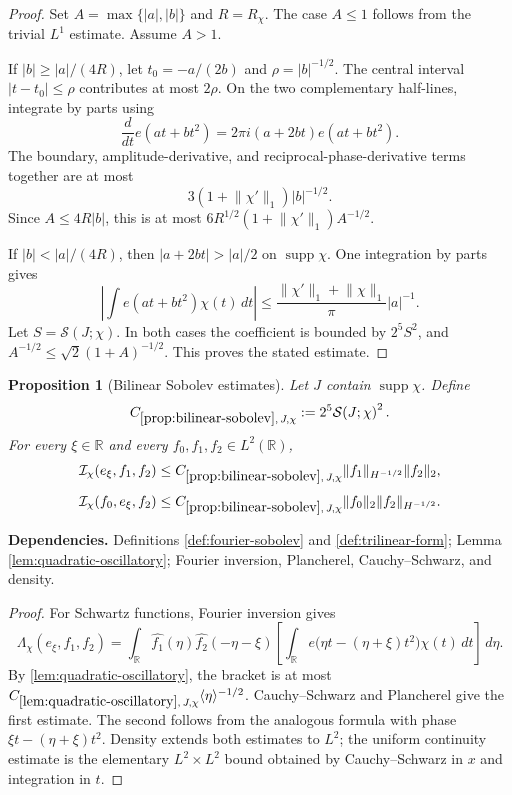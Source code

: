 \documentclass[11pt]{article}
\newtheorem{proposition}[proposition]{Proposition}
\theoremstyle{definition}
\theoremstyle{remark}
\newcommand{\R}{\mathbb R}
\newcommand{\supp}{\operatorname{supp}}
\newcommand{\1}{\mathbf 1}
\newcommand{\FT}[1]{\widehat{#1}}
\newcommand{\br}[1]{\langle #1\rangle}
\newcommand{\dd}{\,d}
\newcommand{\Ichi}{\mathcal I_{\chi}}
\newcommand{\Lamchi}{\Lambda_{\chi}}
\newcommand{\hNorm}[2]{\lVert #1\rVert_{H^{#2}}}
\newcommand{\lpNorm}[2]{\lVert #1\rVert_{#2}}
\newcommand{\uses}[1]{\par\smallskip\noindent\textbf{Dependencies.} #1\par\smallskip}
\newcommand{\Ssize}[2]{\mathcal S\!\left(#1;#2\right)}
\begin{document}
\begin{proof}
Set $A=\max\{|a|,|b|\}$ and $R=R_\chi$.  The case $A\leq1$ follows from the trivial $L^1$ estimate.  Assume $A>1$.

If $|b|\geq|a|/(4R)$, let
$t_0=-a/(2b)$ and $\rho=|b|^{-1/2}$.  The central interval
$|t-t_0|\leq\rho$ contributes at most $2\rho$.  On the two complementary half-lines, integrate by parts using
\[
\frac{d}{dt}e(at+bt^2)=2\pi i(a+2bt)e(at+bt^2).
\]
The boundary, amplitude-derivative, and reciprocal-phase-derivative terms together are at most
\[
3(1+\lpNorm{\chi'}1)|b|^{-1/2}.
\]
Since $A\leq4R|b|$, this is at most
$6R^{1/2}(1+\lpNorm{\chi'}1)A^{-1/2}$.

If $|b|<|a|/(4R)$, then
$|a+2bt|>|a|/2$ on $\supp\chi$.  One integration by parts gives
\[
\left|
\int e(at+bt^2)\chi(t)\dd t
\right|
\leq
\frac{\lpNorm{\chi'}1+\lpNorm\chi1}{\pi}|a|^{-1}.
\]
Let $S=\Ssize{J}{\chi}$.  In both cases the coefficient is bounded by
$2^5S^2$, and $A^{-1/2}\leq\sqrt2(1+A)^{-1/2}$.  This proves the stated estimate.
\end{proof}

\begin{proposition}[Bilinear Sobolev estimates]\label{prop:bilinear-sobolev}
Let $J$ contain $\supp\chi$.  Define
\[
C_{\ref{prop:bilinear-sobolev},\,J,\chi}
:=
2^5\Ssize{J}{\chi}^{2}.
\]
For every $\xi\in\R$ and every $f_0,f_1,f_2\in L^2(\R)$,
\[
\Ichi(e_\xi,f_1,f_2)
\leq
C_{\ref{prop:bilinear-sobolev},\,J,\chi}
\hNorm{f_1}{-1/2}\lpNorm{f_2}2,
\]
\[
\Ichi(f_0,e_\xi,f_2)
\leq
C_{\ref{prop:bilinear-sobolev},\,J,\chi}
\lpNorm{f_0}2\hNorm{f_2}{-1/2}.
\]
\end{proposition}

\uses{Definitions \ref{def:fourier-sobolev} and \ref{def:trilinear-form}; Lemma \ref{lem:quadratic-oscillatory}; Fourier inversion, Plancherel, Cauchy--Schwarz, and density.}

\begin{proof}
For Schwartz functions, Fourier inversion gives
\[
\Lamchi(e_\xi,f_1,f_2)
=
\int_\R\FT{f_1}(\eta)\FT{f_2}(-\eta-\xi)
\left[
\int_\R e\bigl(\eta t-(\eta+\xi)t^2\bigr)\chi(t)\dd t
\right]\dd\eta.
\]
By \cref{lem:quadratic-oscillatory}, the bracket is at most
$C_{\ref{lem:quadratic-oscillatory},\,J,\chi}\br\eta^{-1/2}$.
Cauchy--Schwarz and Plancherel give the first estimate.  The second follows from the analogous formula with phase
$\xi t-(\eta+\xi)t^2$.  Density extends both estimates to $L^2$; the uniform continuity estimate is the elementary $L^2\times L^2$ bound obtained by Cauchy--Schwarz in $x$ and integration in $t$.
\end{proof}
\end{document}

